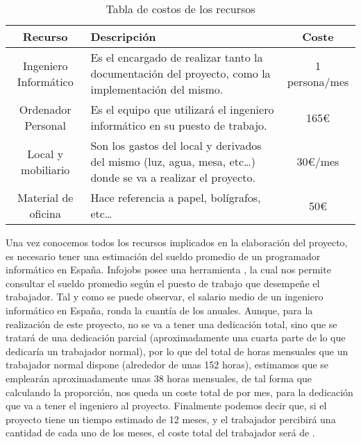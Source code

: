 \begin{table}[H]
    \begin{center}
        \begin{tabular}{||c|p{7.5cm}|c||}
            \hline
            \hline
            \textbf{Recurso} & \textbf{Descripción} & \textbf{Coste} \\
            \hline
            \hline
            Ingeniero Informático & Es el encargado de realizar tanto la
            documentación del proyecto, como la implementación del mismo.
            & 1 persona/mes \\
            \hline
            Ordenador Personal & Es el equipo que utilizará el ingeniero
            informático en su puesto de trabajo. & 165\euro \\
            \hline
            Local y mobiliario & Son los gastos del local y derivados del mismo
            (luz, agua, mesa, etc\ldots) donde se va a realizar el proyecto.
            & 30\euro/mes \\
            \hline
            Material de oficina & Hace referencia a papel, bolígrafos,
            etc\ldots & 50\euro \\
            \hline
            \hline
        \end{tabular}
    \end{center}
    \caption{Tabla de costos de los recursos}
    \label{tab:costorecursos}
\end{table}

Una vez conocemos todos los recursos implicados en la elaboración del proyecto,
es necesario tener una estimación del sueldo promedio de un programador
informático en España. Infojobs posee una herramienta \cite{salarioinfo}, la
cual nos permite consultar el sueldo promedio según el puesto de trabajo que
desempeñe el trabajador. Tal y como se puede observar, el salario medio de un
ingeniero informático en España, ronda la cuantía de los  anuales.
Aunque, para la realización de este proyecto, no se va a tener una dedicación
total, sino que se tratará de una dedicación parcial (aproximadamente una cuarta
parte de lo que dedicaría un trabajador normal), por lo que del total de horas
mensuales que un trabajador normal dispone (alrededor de unas 152 horas),
estimamos que se emplearán aproximadamente unas 38 horas mensuales, de tal forma
que calculando la proporción, nos queda un coste total de  por mes,
para la dedicación que va a tener el ingeniero al proyecto. Finalmente podemos
decir que, si el proyecto tiene un tiempo estimado de 12 meses, y el trabajador
percibirá una cantidad de  cada uno de los meses, el coste total del
trabajador será de .

